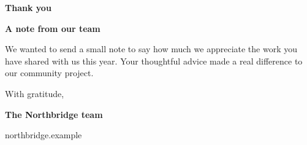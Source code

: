 \documentclass[12pt]{article}
\begin{document}
\begin{frontcover}
  \centering\vfill
  {\color{cardblue}\sffamily\bfseries\Huge Thank you}\par
  \vspace{8mm}{\large For your care, time, and generous help.}\par\vfill
\end{frontcover}
\begin{insideleft}
  \sffamily\textbf{A note from our team}\par\medskip
  We wanted to send a small note to say how much we appreciate the work
  you have shared with us this year. Your thoughtful advice made a real
  difference to our community project.
\end{insideleft}
\begin{insideright}
  \centering\vfill\Large With gratitude,\par\bigskip
  \textbf{The Northbridge team}\par\vfill
\end{insideright}
\begin{backcover}
  \centering\vfill\small\sffamily northbridge.example\par\vfill
\end{backcover}
\end{document}
